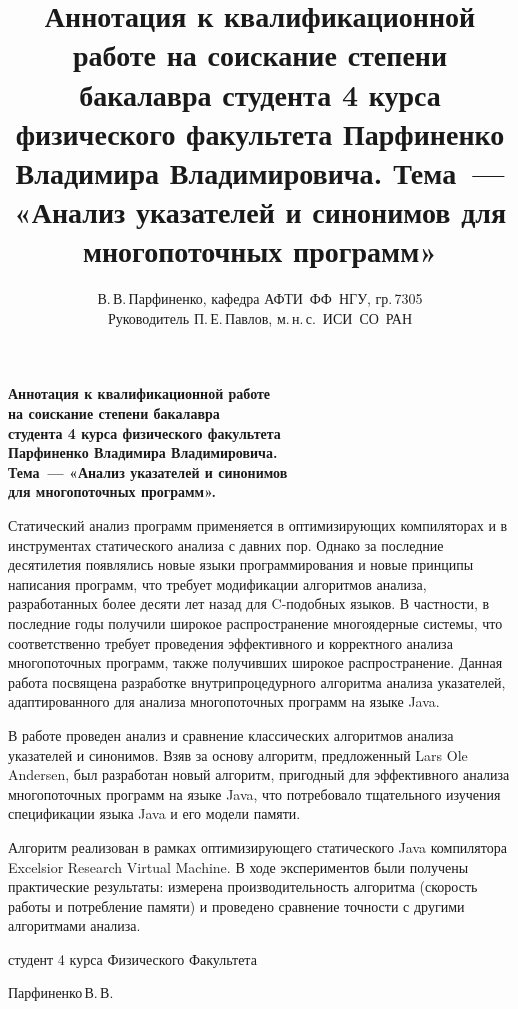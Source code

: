 \documentclass[12pt]{article}
\title{
  Аннотация к квалификационной работе на соискание степени бакалавра студента 4
  курса физического факультета Парфиненко Владимира Владимировича.
  Тема~--- «Анализ указателей и синонимов для многопоточных программ»
}
\author{
  В.\,В.\,Парфиненко, кафедра АФТИ~ФФ~НГУ, гр.\,7305\\
  Руководитель П.\,Е.\,Павлов, м.\,н.\,с.~ИСИ~СО~РАН
}
\newcommand{\eng}[1]{{\English#1}}
\begin{document}
  \thispagestyle{empty}

  \begin{center}
    \bfseries
    Аннотация к квалификационной работе\\
    на соискание степени бакалавра\\
    студента 4 курса физического факультета\\
    Парфиненко Владимира Владимировича.\\
    Тема~--- «Анализ указателей и синонимов\\
    для многопоточных программ».
  \end{center}
  \vspace{0.5cm}

  Статический анализ программ применяется в оптимизирующих компиляторах и в
  инструментах статического анализа с давних пор. Однако за последние
  десятилетия появлялись новые языки программирования и новые принципы
  написания программ, что требует модификации алгоритмов анализа, разработанных
  более десяти лет назад для \eng{C}-подобных языков. В частности, в последние
  годы получили широкое распространение многоядерные системы, что
  соответственно требует проведения эффективного и корректного анализа
  многопоточных программ, также получивших широкое распространение.
  Данная работа посвящена разработке внутрипроцедурного алгоритма анализа
  указателей, адаптированного для анализа многопоточных программ на языке
  \eng{Java}.

  В работе проведен анализ и сравнение классических алгоритмов анализа
  указателей и синонимов. Взяв за основу алгоритм, предложенный \eng{Lars Ole
  Andersen}, был разработан новый алгоритм, пригодный для эффективного анализа
  многопоточных программ на языке \eng{Java}, что потребовало тщательного
  изучения спецификации языка \eng{Java} и его модели памяти.

  Алгоритм реализован в рамках оптимизирующего статического \eng{Java}
  компилятора \eng{Excelsior Research Virtual Machine}. В ходе экспериментов
  были получены практические результаты: измерена производительность алгоритма
  (скорость работы и потребление памяти) и проведено сравнение точности
  с другими алгоритмами анализа.

  \vspace{0.5cm}

  \begin{flushright}

    студент 4 курса Физического Факультета

    Парфиненко\,В.\,В.

  \end{flushright}
\end{document}
